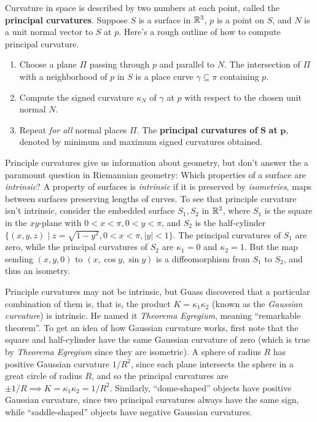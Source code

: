 Curvature in space is described by two numbers at each point, called the \textbf{principal curvatures}. Suppose $S$ is a surface in $\mathbb{R}^3$, $p$ is a point on $S$, and $N$ is a unit normal vector to $S$ at $p$. Here's a rough outline of how to compute principal curvature.
\begin{enumerate}
    \item Choose a plane $\Pi$ passing through $p$ and parallel to $N$. The intersection of $\Pi$ with a neighborhood of $p$ in $S$ is a place curve $\gamma \subseteq \pi$ containing $p$.
    \item Compute the signed curvature $\kappa_N$ of $\gamma$ at $p$ with respect to the chosen unit normal $N$.
    \item Repeat \emph{for all} normal places $\Pi$. The \textbf{principal curvatures of} $\mathbf S$ \textbf{at} $\mathbf p$, denoted by minimum and maximum signed curvatures obtained.
\end{enumerate}
Principle curvatures give us information about geometry, but don't answer the a paramount question in Riemannian geometry: Which properties of a surface are \emph{intrinsic}? A property of surfaces is \emph{intrinsic} if it is preserved by \emph{isometries}, maps between surfaces preserving lengths of curves. To see that principle curvature isn't intrinsic, consider the embedded surface $S_1, S_2$ in $\mathbb{R}^3$, where $S_1$ is the square in the $xy$-plane with $0<x<\pi, 0 < y < \pi$, and $S_2$ is the half-cylinder $\{(x,y,z) \mid  z = \sqrt{1-y^2} , 0<x<\pi, |y|<1\} $. The principal curvatures of $S_1$ are zero, while the principal curvatures of $S_2$ are $\kappa_1=0$ and $\kappa_2=1$. But the map sending $(x,y,0)$ to $(x,\cos y, \sin y)$ is a diffeomorphism from $S_1$ to $S_2$, and thus an isometry.

Principle curvatures may not be intrinsic, but Guass discovered that a particular combination of them is, that is, the product $K=\kappa_1\kappa_2$ (known as the \emph{Gaussian curvature}) is intrinsic. He named it \emph{Theorema Egregium}, meaning ``remarkable theorem''. To get an idea of how Gaussian curvature works, first note that the square and half-cylinder have the same Gaussian curvature of zero (which is true by \emph{Theorema Egregium} since they are isometric). A sphere of radius $R$ has positive Gaussian curvature $1 /R^2$, since each plane intersects the sphere in a great circle of radius $R$, and so the principal curvatures are $\pm 1/R\implies K=\kappa_1\kappa_2= 1/ R^2$. Similarly, ``dome-shaped'' objects have positive Gaussian curvature, since two principal curvatures always have the same sign, while ``saddle-shaped'' objects have negative Gaussian curvatures.

